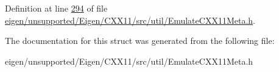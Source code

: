 Definition at line \hyperlink{eigen_2unsupported_2_eigen_2_c_x_x11_2src_2util_2_emulate_c_x_x11_meta_8h_source_l00294}{294} of file \hyperlink{eigen_2unsupported_2_eigen_2_c_x_x11_2src_2util_2_emulate_c_x_x11_meta_8h_source}{eigen/unsupported/\+Eigen/\+C\+X\+X11/src/util/\+Emulate\+C\+X\+X11\+Meta.\+h}.



The documentation for this struct was generated from the following file\+:\begin{DoxyCompactItemize}
\item 
eigen/unsupported/\+Eigen/\+C\+X\+X11/src/util/\+Emulate\+C\+X\+X11\+Meta.\+h\end{DoxyCompactItemize}
